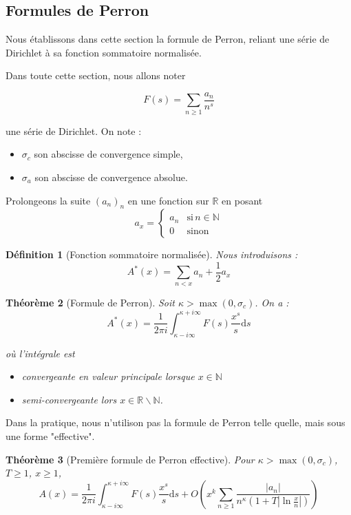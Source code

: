 \documentclass[french]{report}
\newtheorem{theorem}{Théorème}[section]
\newtheorem{definition}[theorem]{Définition}
\begin{document}
\subsection{Formules de Perron}

Nous établissons dans cette section la formule de Perron, reliant une série de Dirichlet à sa fonction sommatoire normalisée.

Dans toute cette section, nous allons noter

\[ F(s) =\sum_{n\geq1}\frac{a_n}{n^s}\]

une série de Dirichlet. On note :
\begin{itemize}
  \item $\sigma_c$ son abscisse de convergence simple,
  \item $\sigma_a$ son abscisse de convergence absolue.
\end{itemize}

Prolongeons la suite $(a_n)_n$ en une fonction sur $\mathbb{R}$ en posant
\[
  a_x=
  \begin{cases}
    a_n & \text{si}\,n\in\mathbb{N} \\
    0  & \text{sinon}
  \end{cases}
\]
\begin{definition}[Fonction sommatoire normalisée]
  Nous introduisons :
  \[ A^*(x) = \sum_{n<x}a_n + \frac{1}{2}a_x \]
\end{definition}

\begin{theorem}[Formule de Perron]
  Soit $\kappa>\max(0,\sigma_c)$. On a :
  \[
    A^*(x) = \frac{1}{2\pi i}\int_{\kappa-i\infty}^{\kappa+i\infty}F(s)\frac{x^s}{s}\mathrm{d}s
  \]

  où l'intégrale est
  \begin{itemize}
    \item convergeante en valeur principale lorsque $x\in\mathbb{N}$
    \item semi-convergeante lors $x\in\mathbb{R}\backslash\mathbb{N}$.
  \end{itemize}
\end{theorem}

Dans la pratique, nous n'utilison pas la formule de Perron telle quelle, mais sous une forme "effective".

\begin{theorem}[Première formule de Perron effective]
  Pour $\kappa>\max(0,\sigma_c)$, $T\geq1$, $x\geq1$,
  \[ A(x) = \frac{1}{2\pi i}\int_{\kappa-i\infty}^{\kappa+i\infty}F(s)\frac{x^s}{s}\mathrm{d}s + O\left(x^k\sum_{n\geq1}\frac{|a_n|}{n^\kappa(1+T|\ln\frac{x}{n}|)}\right) \]
\end{theorem}
\end{document}
